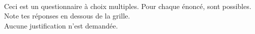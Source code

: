 \documentclass[a4paper,11pt]{article}
\begin{document}
\newpage

\begin{exercice}[(4 points)] \

	\begin{attention}
		Ceci est un questionnaire à choix multiples. Pour chaque énoncé, \textbf{} \textbf{} sont possibles. \\[0.5em]
		Note tes réponses en dessous de la grille. \\[0.5em]
		Aucune justification n'est demandée.

		\begin{other_exemple}
		\end{other_exemple}
	\end{attention}


\end{exercice}
\end{document}
